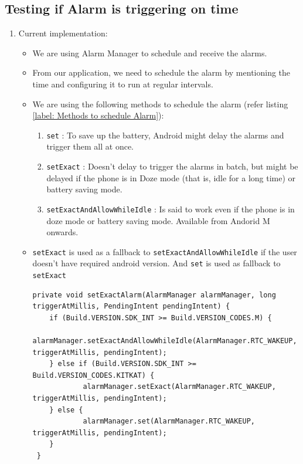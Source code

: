 \documentclass{article}
\begin{document}
\subsection{Testing if Alarm is triggering on time}
\begin{enumerate}
    \item Current implementation: 
    \begin{itemize}
        \item We are using Alarm Manager to schedule and receive the alarms.
        \item From our application, we need to schedule the alarm by mentioning the time and configuring it to run at regular intervals.
        \item We are using the following methods to schedule the alarm \cite{Schedule_Alarm} \cite{AlarmManager_Medium} (refer listing \ref{label: Methods to schedule Alarm}): 

        \begin{enumerate}
            \item \texttt{set} : To save up the battery, Android might delay the alarms and trigger them all at once.
            \item \texttt{setExact} : Doesn't delay to trigger the alarms in batch, but might be delayed if the phone is in Doze mode (that is, idle for a long time) or battery saving mode. 
            \item \texttt{setExactAndAllowWhileIdle} : Is said to work even if the phone is in doze mode or battery saving mode. Available from Andorid M onwards. 
        \end{enumerate}
        \item \texttt{setExact} is used as a fallback to \texttt{setExactAndAllowWhileIdle} if the user doesn't have required android version. And \texttt{set} is used as fallback to \texttt{setExact}
    
 \begin{lstlisting}[caption={Methods used to schedule alarm},label={label: Methods to schedule Alarm}]
    private void setExactAlarm(AlarmManager alarmManager, long triggerAtMillis, PendingIntent pendingIntent) {
    if (Build.VERSION.SDK_INT >= Build.VERSION_CODES.M) {
            alarmManager.setExactAndAllowWhileIdle(AlarmManager.RTC_WAKEUP, triggerAtMillis, pendingIntent);
    } else if (Build.VERSION.SDK_INT >= Build.VERSION_CODES.KITKAT) {
            alarmManager.setExact(AlarmManager.RTC_WAKEUP, triggerAtMillis, pendingIntent);
    } else {
            alarmManager.set(AlarmManager.RTC_WAKEUP, triggerAtMillis, pendingIntent);
    }
 }
 \end{lstlisting}


\end{itemize}
\end{enumerate}
\end{document}
